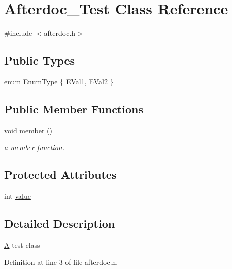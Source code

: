 \hypertarget{class_afterdoc___test}{}\section{Afterdoc\+\_\+\+Test Class Reference}
\label{class_afterdoc___test}


{\ttfamily \#include $<$afterdoc.\+h$>$}

\subsection*{Public Types}
\begin{DoxyCompactItemize}
\item 
enum \hyperlink{class_afterdoc___test_a20912c6b82fc0ee7d195d2468f1b2ff2}{Enum\+Type} \{ \hyperlink{class_afterdoc___test_a20912c6b82fc0ee7d195d2468f1b2ff2a8fc935f8d352ba9f6d53ea29b6c5af49}{E\+Val1}, 
\hyperlink{class_afterdoc___test_a20912c6b82fc0ee7d195d2468f1b2ff2a988694809f6d25c498ed7ce246110a2c}{E\+Val2}
 \}
\end{DoxyCompactItemize}
\subsection*{Public Member Functions}
\begin{DoxyCompactItemize}
\item 
void \hyperlink{class_afterdoc___test_a596dd7e8230777e2e65779e0da29177b}{member} ()
\begin{DoxyCompactList}\small\item\em a member function. \end{DoxyCompactList}\end{DoxyCompactItemize}
\subsection*{Protected Attributes}
\begin{DoxyCompactItemize}
\item 
int \hyperlink{class_afterdoc___test_ac4f474c82e82cbb89ca7c36dd52be0ed}{value}
\end{DoxyCompactItemize}


\subsection{Detailed Description}
\hyperlink{class_a}{A} test class 

Definition at line 3 of file afterdoc.\+h.



